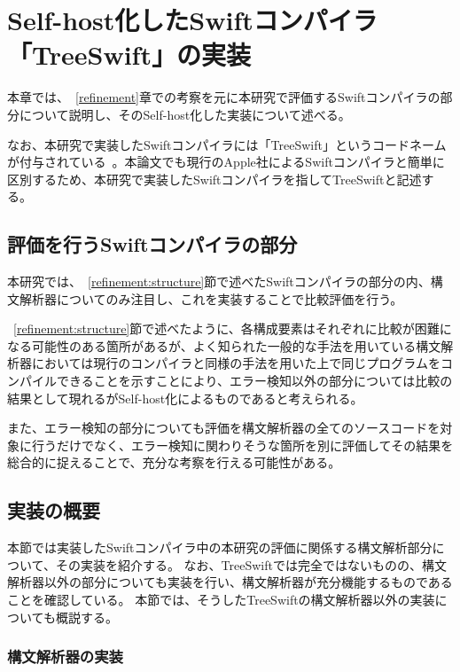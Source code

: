 \chapter{Self-host化したSwiftコンパイラ「TreeSwift」の実装}
\label{implementation}

本章では、~\ref{refinement}章での考察を元に本研究で評価するSwiftコンパイラの部分について説明し、そのSelf-host化した実装について述べる。

なお、本研究で実装したSwiftコンパイラには「TreeSwift」というコードネームが付与されている~\cite{treeswift}。本論文でも現行のApple社によるSwiftコンパイラと簡単に区別するため、本研究で実装したSwiftコンパイラを指してTreeSwiftと記述する。

\section{評価を行うSwiftコンパイラの部分}

本研究では、~\ref{refinement:structure}節で述べたSwiftコンパイラの部分の内、構文解析器についてのみ注目し、これを実装することで比較評価を行う。

~\ref{refinement:structure}節で述べたように、各構成要素はそれぞれに比較が困難になる可能性のある箇所があるが、よく知られた一般的な手法を用いている構文解析器においては現行のコンパイラと同様の手法を用いた上で同じプログラムをコンパイルできることを示すことにより、エラー検知以外の部分については比較の結果として現れるがSelf-host化によるものであると考えられる。

また、エラー検知の部分についても評価を構文解析器の全てのソースコードを対象に行うだけでなく、エラー検知に関わりそうな箇所を別に評価してその結果を総合的に捉えることで、充分な考察を行える可能性がある。

\section{実装の概要}
\label{implementation:abstract}

本節では実装したSwiftコンパイラ中の本研究の評価に関係する構文解析部分について、その実装を紹介する。
なお、TreeSwiftでは完全ではないものの、構文解析器以外の部分についても実装を行い、構文解析器が充分機能するものであることを確認している。
本節では、そうしたTreeSwiftの構文解析器以外の実装についても概説する。

\subsection{構文解析器の実装}
\label{implementation:abstract:parser}

